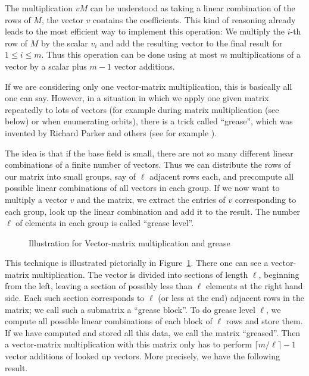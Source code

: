 The multiplication $vM$ can be understood as taking a linear combination
of the rows of $M$, the vector $v$ contains the coefficients. This
kind of reasoning already leads to the most efficient way to implement
this operation: We multiply the $i$-th row of $M$ by the scalar
$v_i$ and add the resulting vector to the final result for $1 \le i \le m$.
Thus this operation can be done using at most $m$ multiplications
of a vector by a scalar plus $m-1$ vector additions.

If we are considering only one vector-matrix multiplication, this is basically
all one can say. However, in a situation in which we apply one given
matrix repeatedly to lots of vectors (for example during matrix 
multiplication (see below) or when enumerating orbits), there is a
trick called ``grease'', which was invented by Richard Parker and 
%
others (see for example \cite[Algorithm~6.2]{ahohop}).

The idea is that if the base field is small, there are not so many
different linear combinations of a finite number of vectors. Thus
we can distribute the rows of our matrix into small groups, say of
$\ell$ adjacent rows each, and precompute all possible linear combinations of
all vectors in each group. If we now want to multiply a vector $v$ and the 
matrix, we extract the entries of $v$ corresponding to each group,
look up the linear combination and add it to the result. The number
$\ell$ of elements in each group is called ``grease level''.

\begin{figure}[ht]
\begin{center}

\end{center}
\caption{Illustration for Vector-matrix multiplication and grease}
%
\label{grease}
\end{figure}

This technique is illustrated pictorially in Figure~\ref{grease}. There
one can see a vector-matrix multiplication. The vector is divided into
sections of length $\ell$, beginning from the left, leaving a section of
possibly less than $\ell$ elements at the right hand side. Each such section
corresponds to $\ell$ (or less at the end) adjacent rows in the matrix; we 
call such a submatrix a ``grease block''.
To do grease level $\ell$, we compute all possible linear combinations of
each block of $\ell$ rows and store them. If we have computed and stored
all this data, we call the matrix ``greased''.
%
Then a vector-matrix multiplication
with this matrix only has to perform $\lceil m/\ell \rceil -1$ vector additions
of looked up vectors. More precisely, we have the following result.

